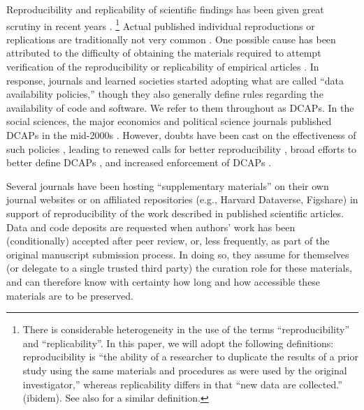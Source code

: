 Reproducibility and replicability of scientific findings has been given great scrutiny in recent years \parencite{CamererScience2016,Collaboration2015-ev,Klein2014,FanelliPNAS2018}.%
%
\footnote{There is considerable heterogeneity in the use of the terms
	``reproducibility'' and ``replicability''. In this paper, we will adopt
	the following definitions: reproducibility is ``the ability of a
	researcher to duplicate the results of a prior study using the same
	materials and procedures as were used by the original investigator,''
	\parencite{Bollen2015} whereas replicability
	differs in that ``new data are collected.'' (ibidem). See also \cite{NationalAcademiesofSciencesEngineeringandMedicine2019} for a similar definition.}
%
Actual published individual reproductions or replications are traditionally not very common \parencite[in economics, see][]{BellMiller2013b,Duvendack2017}. One possible cause has been attributed to the difficulty of obtaining the materials required to attempt verification of the  reproducibility or replicability of empirical articles \parencite{Dewald1986,McCullough2006,McCullough03}.  
%
In response, journals and learned societies started adopting what are called ``data availability policies,'' though they also generally define rules regarding the availability of code and software. We refer to them throughout as \acp{DCAP}. In the social sciences, the major economics and political science journals published \acp{DCAP} in the mid-2000s \parencite{American_Economic_Association2008-wayback,nicholaseubankThePoliticalMethodologist2014}. 
%
However, doubts have been cast on the effectiveness of such policies \parencite{stodden_toward_2013,StoddenPNAS2018,Hoeffler2017,ChangAm.Econ.Rev.2017}, leading to renewed calls for better reproducibility \parencite{stodden_enhancing_2016}, broad efforts to better define \acp{DCAP} \parencite{CenterforOpenScience2016,HrynaszkiewiczInt.J.Digit.Curation2017}, and increased enforcement of \acp{DCAP} \parencite{JacobyInsideHigherEd2017,10.1257/pandp.108.745,VilhuberAEAPap.Proc.2019}.

Several journals have been hosting ``supplementary materials'' on their own journal websites or on affiliated repositories (e.g., Harvard Dataverse, Figshare) in support of reproducibility of the work described in published scientific articles. Data and code deposits are requested when authors' work has been (conditionally) accepted after peer review, or, less frequently, as part of the original manuscript submission process. In doing so, they assume for themselves (or delegate to a single trusted third party) the curation role for these materials, and can therefore know with certainty how long and how accessible these materials are to be preserved.

